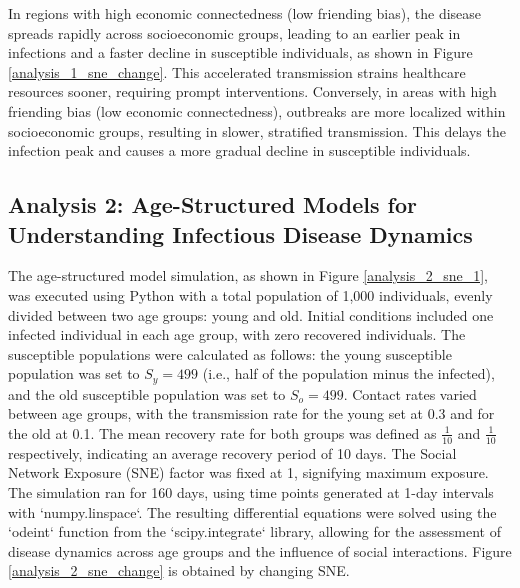 \documentclass[9 pt]{article} %
\begin{document}
In regions with high economic connectedness (low friending bias), the disease spreads rapidly across socioeconomic groups, leading to an earlier peak in infections and a faster decline in susceptible individuals, as shown in Figure \ref{analysis_1_sne_change}. This accelerated transmission strains healthcare resources sooner, requiring prompt interventions. Conversely, in areas with high friending bias (low economic connectedness), outbreaks are more localized within socioeconomic groups, resulting in slower, stratified transmission. This delays the infection peak and causes a more gradual decline in susceptible individuals.

\subsection{Analysis 2: Age-Structured Models for Understanding Infectious Disease Dynamics}

The age-structured model simulation, as shown in Figure \ref{analysis_2_sne_1}, was executed using Python with a total population of 1,000 individuals, evenly divided between two age groups: young and old. Initial conditions included one infected individual in each age group, with zero recovered individuals. The susceptible populations were calculated as follows: the young susceptible population was set to \(S_y = 499\) (i.e., half of the population minus the infected), and the old susceptible population was set to \(S_o = 499\). Contact rates varied between age groups, with the transmission rate for the young set at 0.3 and for the old at 0.1. The mean recovery rate for both groups was defined as \(\frac{1}{10}\) and \( \frac{1}{10}\) respectively, indicating an average recovery period of 10 days.
The Social Network Exposure (SNE) factor was fixed at 1, signifying maximum exposure. The simulation ran for 160 days, using time points generated at 1-day intervals with `numpy.linspace`. The resulting differential equations were solved using the `odeint` function from the `scipy.integrate` library, allowing for the assessment of disease dynamics across age groups and the influence of social interactions. Figure \ref{analysis_2_sne_change} is obtained by changing SNE. 
\end{document}

